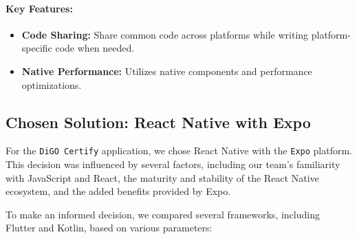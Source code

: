 \paragraph{Key Features:}

\begin{itemize}
    \item \textbf{Code Sharing:} Share common code across platforms while writing platform-specific code when needed.
    \item \textbf{Native Performance:} Utilizes native components and performance optimizations.
\end{itemize}

\subsection{Chosen Solution: React Native with Expo}

For the \texttt{DiGO Certify} application, we chose React Native with the \texttt{Expo} platform. This decision was influenced by several factors, including our team's familiarity with JavaScript and React, the maturity and stability of the React Native ecosystem, and the added benefits provided by Expo\cite{Expo}.

To make an informed decision, we compared several frameworks, including Flutter and Kotlin, based on various parameters:

